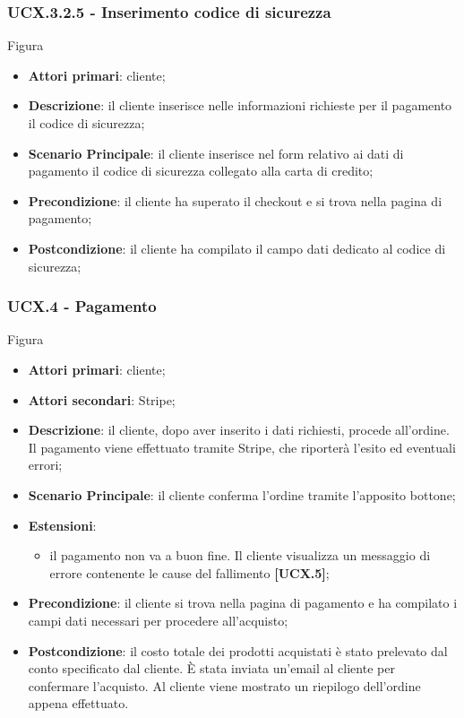 \subsubsection{UCX.3.2.5 - Inserimento codice di sicurezza}
Figura \\
\begin{itemize}
\item \textbf{Attori primari}: cliente;
\item \textbf{Descrizione}: il cliente inserisce nelle informazioni richieste per il pagamento il codice di sicurezza;
\item \textbf{Scenario Principale}: il cliente inserisce nel form relativo ai dati di pagamento il codice di sicurezza collegato alla carta di credito;
\item \textbf{Precondizione}: il cliente ha superato il checkout e si trova nella pagina di pagamento;
\item \textbf{Postcondizione}: il cliente ha compilato il campo dati dedicato al codice di sicurezza;
\end{itemize}

\subsubsection{UCX.4 - Pagamento}
Figura \\
\begin{itemize}
\item \textbf{Attori primari}: cliente;
\item \textbf{Attori secondari}: Stripe;
\item \textbf{Descrizione}: il cliente, dopo aver inserito i dati richiesti, procede all'ordine. Il pagamento viene effettuato tramite Stripe, che riporterà l'esito ed eventuali errori;
\item \textbf{Scenario Principale}: il cliente conferma l'ordine tramite l'apposito bottone;
\item \textbf{Estensioni}:
\begin{itemize}
	\item il pagamento non va a buon fine. Il cliente visualizza un messaggio di errore contenente le cause del fallimento \textbf{[UCX.5]};
\end{itemize}
\item \textbf{Precondizione}: il cliente si trova nella pagina di pagamento e ha compilato i campi dati necessari per procedere all'acquisto;
\item \textbf{Postcondizione}: il costo totale dei prodotti acquistati è stato prelevato dal conto specificato dal cliente. È stata inviata un'email al cliente per confermare l'acquisto. Al cliente viene mostrato un riepilogo dell'ordine appena effettuato.
\end{itemize}

